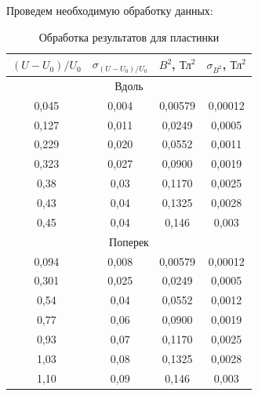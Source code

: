 \documentclass[a4paper,12pt]{extarticle}
\begin{document}
Проведем необходимую обработку данных:
\begin{table}[H]
\centering
\begin{tabular}{|c|c|c|c|}
\hline
\multicolumn{1}{|c|}{$(U - U_0)/U_0$}  & \multicolumn{1}{c|}{$\sigma_{(U - U_0)/U_0}$} & \multicolumn{1}{c|}{$B^2$, $\text{Тл}^2$} & $\sigma_{B^2}$, $\text{Тл}^2$ \\ \hline
\multicolumn{4}{|c|}{Вдоль} \\ \hline
\multicolumn{1}{|c|}{0,045} & \multicolumn{1}{c|}{0,004} & \multicolumn{1}{c|}{0,00579} & 0,00012 \\ \hline
\multicolumn{1}{|c|}{0,127}   & \multicolumn{1}{c|}{0,011}   & \multicolumn{1}{c|}{0,0249} & 0,0005 \\ \hline
\multicolumn{1}{|c|}{0,229}  & \multicolumn{1}{c|}{0,020}  & \multicolumn{1}{c|}{0,0552}   & 0,0011   \\ \hline
\multicolumn{1}{|c|}{0,323}  & \multicolumn{1}{c|}{0,027}  & \multicolumn{1}{c|}{0,0900}       & 0,0019  \\ \hline
\multicolumn{1}{|c|}{0,38}  & \multicolumn{1}{c|}{0,03}  & \multicolumn{1}{c|}{0,1170}   & 0,0025  \\ \hline
\multicolumn{1}{|c|}{0,43}  & \multicolumn{1}{c|}{0,04}  & \multicolumn{1}{c|}{0,1325}   & 0,0028  \\ \hline
\multicolumn{1}{|c|}{0,45}  & \multicolumn{1}{c|}{0,04}  & \multicolumn{1}{c|}{0,146}   & 0,003  \\ \hline
\multicolumn{4}{|c|}{Поперек} \\ \hline
\multicolumn{1}{|c|}{0,094} & \multicolumn{1}{c|}{0,008} & \multicolumn{1}{c|}{0,00579} & 0,00012 \\ \hline
\multicolumn{1}{|c|}{0,301}  & \multicolumn{1}{c|}{0,025}  & \multicolumn{1}{c|}{0,0249} & 0,0005 \\ \hline
\multicolumn{1}{|c|}{0,54}  & \multicolumn{1}{c|}{0,04}  & \multicolumn{1}{c|}{0,0552}   & 0,0012   \\ \hline
\multicolumn{1}{|c|}{0,77}  & \multicolumn{1}{c|}{0,06}  & \multicolumn{1}{c|}{0,0900}       & 0,0019  \\ \hline
\multicolumn{1}{|c|}{0,93}  & \multicolumn{1}{c|}{0,07}  & \multicolumn{1}{c|}{0,1170}   & 0,0025  \\ \hline
\multicolumn{1}{|c|}{1,03}    & \multicolumn{1}{c|}{0,08}  & \multicolumn{1}{c|}{0,1325}   & 0,0028  \\ \hline
\multicolumn{1}{|c|}{1,10}   & \multicolumn{1}{c|}{0,09}  & \multicolumn{1}{c|}{0,146}   & 0,003  \\ \hline
\end{tabular}
\caption{Обработка результатов для пластинки}
\end{table}
\end{document}

